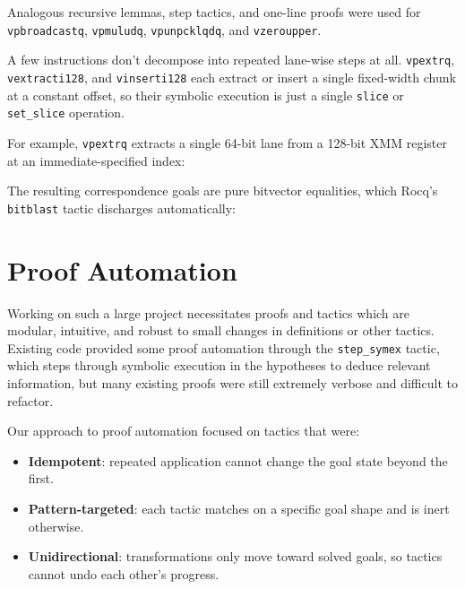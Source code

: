 
Analogous recursive lemmas, step tactics, and one-line proofs were used for \texttt{vpbroadcastq}, \texttt{vpmuludq}, \texttt{vpunpcklqdq}, and \texttt{vzeroupper}.

A few instructions don't decompose into repeated lane-wise steps at all. \texttt{vpextrq}, \texttt{vextracti128}, and \texttt{vinserti128} each extract or insert a single fixed-width chunk at a constant offset, so their symbolic execution is just a single \texttt{slice} or \texttt{set_slice} operation. 

For example, \texttt{vpextrq} extracts a single 64-bit lane from a 128-bit XMM register at an immediate-specified index:


The resulting correspondence goals are pure bitvector equalities, which Rocq's \texttt{bitblast} tactic discharges automatically:



\section{Proof Automation}
\label{sec:proof-automation}

Working on such a large project necessitates proofs and tactics which are modular, intuitive, and robust to small changes in definitions or other tactics.
Existing code provided some proof automation through the \texttt{step_symex} tactic, which steps through symbolic execution in the hypotheses to deduce relevant information, but many existing proofs were still extremely verbose and difficult to refactor. 

Our approach to proof automation focused on tactics that were:
  \begin{itemize}
      \item \textbf{Idempotent}: repeated application cannot change the goal state beyond the first.
      \item \textbf{Pattern-targeted}: each tactic matches on a specific goal shape and is inert otherwise.
      \item \textbf{Unidirectional}: transformations only move toward solved goals, so tactics cannot undo each other's progress.
  \end{itemize}

